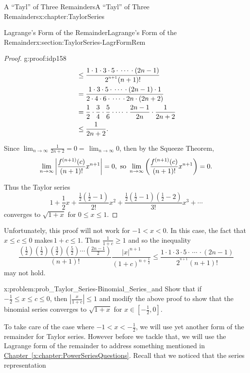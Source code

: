\begin{chapterptx}{A ``Tayl'' of Three Remainders}{}{A ``Tayl'' of Three Remainders}{}{}{x:chapter:TaylorSeries}
\begin{sectionptx}{Lagrange's Form of the Remainder}{}{Lagrange's Form of the Remainder}{}{}{x:section:TaylorSeries-LagrFormRem}
\begin{proof}{}{g:proof:idp158}
\begin{align*}
				& \leq\frac{1\cdot 1\cdot 3\cdot5\cdot\,\cdots\,\cdot\left(2n-1\right)}{2^{^{n+1}}(n+1)!}\\
				& =\frac{1\cdot 3\cdot 5\cdot\,\cdots\,\cdot\left(2n-1\right)\cdot 1}{2\cdot4\cdot 6\cdot\,\cdots\,\cdot 2n\cdot\left(2n+2\right)}\\
				& =\frac{1}{2}\cdot\frac{3}{4}\cdot\frac{5}{6}\cdot\cdots\,\cdot\frac{2n-1}{2n}\cdot\frac{1}{2n+2}\\
				& \leq\frac{1}{2n+2}\text{.}
			\end{align*}
			\par
			Since \(\lim_{n\rightarrow\infty}\frac{1}{2n+2}=0=\,\lim_{n\rightarrow\infty}0\), then by the Squeeze Theorem,%
			\begin{equation*}
				\lim_{n\rightarrow\infty}\left|\frac{f^{(n+1)}(c)}{(n+1)!}x^{n+1}\right|=0, \text{ so } \lim_{n\rightarrow\infty}\left(\frac{f^{(n+1)}(c)}{(n+1)!}x^{n+1}\right)=0\text{.}
			\end{equation*}
			\par
			Thus the Taylor series%
			\begin{equation*}
				1+\frac{1}{2}x+\frac{\frac{1}{2}\left(\frac{1}{2}-1\right)}{2!}x^2+\frac{\frac{1}{2}\left(\frac{1}{2}-1\right)\left(\frac{1}{2}-2\right)}{3!}x^3+\cdots
			\end{equation*}
			converges to \(\sqrt{1+x}\) for \(0\leq x\leq 1\).%
		\end{proof}
		Unfortunately, this proof will not work for \(-1\lt x\lt 0\). In this case, the fact that \(x\leq c\leq 0\) makes\(\,1+c\leq 1\). Thus \(\frac{1}{1+c}\geq 1\) and so the inequality%
		\begin{equation*}
			\frac{\left(\frac{1}{2}\right)\left(\frac{1}{2}\right)\left(\frac{3}{2}\right)\left(\frac{5}{2}\right)\cdots\left(\frac{2n-1}{2}\right)}{(n+1)!}\frac{|x|^{n+1}}{(1+c)^{n+\frac{1}{2}}}\leq\frac{1\cdot 1\cdot 3\cdot 5\cdot\,\cdots\,\cdot\left(2n-1\right)}{2^{^{n+1}}(n+1)!}
		\end{equation*}
		may not hold.%
		\begin{problem}{}{x:problem:prob_Taylor_Series-Binomial_Series_and}%
			 Show that if \(-\frac{1}{2}\leq x\leq c\leq 0\), then \(|\frac{x}{1+c}|\leq 1\) and modify the above proof to show that the binomial series converges to \(\sqrt{1+x}\) for \(x\in\left[-\frac{1}{2},0\right]\).%
		\end{problem}
		To take care of the case where \(-1\lt x\lt -\frac{1}{2}\), we will use yet another form of the remainder for Taylor series. However before we tackle that, we will use the Lagrange form of the remainder to address something mentioned in \hyperref[x:chapter:PowerSeriesQuestions]{Chapter~{\xreffont\ref{x:chapter:PowerSeriesQuestions}}}. Recall that we noticed that the series representation%

\end{sectionptx}
\end{chapterptx}
